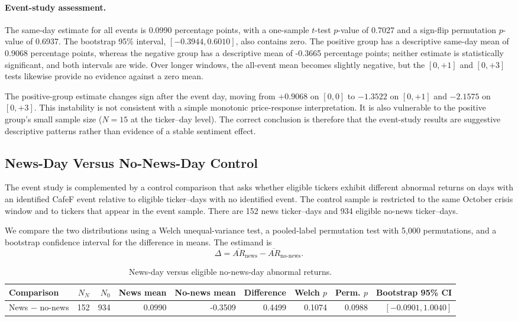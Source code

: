 \paragraph{Event-study assessment.}
The same-day estimate for all events is 0.0990 percentage points, with a one-sample $t$-test $p$-value of 0.7027 and a sign-flip permutation $p$-value of 0.6937. The bootstrap 95\% interval, $[-0.3944,0.6010]$, also contains zero. The positive group has a descriptive same-day mean of 0.9068 percentage points, whereas the negative group has a descriptive mean of -0.3665 percentage points; neither estimate is statistically significant, and both intervals are wide. Over longer windows, the all-event mean becomes slightly negative, but the $[0,+1]$ and $[0,+3]$ tests likewise provide no evidence against a zero mean.

The positive-group estimate changes sign after the event day, moving from $+0.9068$ on $[0,0]$ to $-1.3522$ on $[0,+1]$ and $-2.1575$ on $[0,+3]$. This instability is not consistent with a simple monotonic price-response interpretation. It is also vulnerable to the positive group's small sample size ($N=15$ at the ticker--day level). The correct conclusion is therefore that the event-study results are suggestive descriptive patterns rather than evidence of a stable sentiment effect.

\subsection{News-Day Versus No-News-Day Control}
\label{subsec:news-control}

The event study is complemented by a control comparison that asks whether eligible tickers exhibit different abnormal returns on days with an identified CafeF event relative to eligible ticker--days with no identified event. The control sample is restricted to the same October crisis window and to tickers that appear in the event sample. There are 152 news ticker--days and 934 eligible no-news ticker--days.

We compare the two distributions using a Welch unequal-variance test, a pooled-label permutation test with 5,000 permutations, and a bootstrap confidence interval for the difference in means. The estimand is
\[
 \Delta=\overline{AR}_{\text{news}}-\overline{AR}_{\text{no-news}}.
\]

\begin{table}[htbp]
\centering
\caption{News-day versus eligible no-news-day abnormal returns.}
\label{tab:news-control}
\begin{tabular}{lrrrrrrrr}
\toprule
\textbf{Comparison} & \textbf{$N_N$} & \textbf{$N_0$} & \textbf{News mean} & \textbf{No-news mean} & \textbf{Difference} & \textbf{Welch $p$} & \textbf{Perm. $p$} & \textbf{Bootstrap 95\% CI} \\
\midrule
News $-$ no-news & 152 & 934 & 0.0990 & -0.3509 & 0.4499 & 0.1074 & 0.0988 & $[-0.0901,1.0040]$ \\
\bottomrule
\end{tabular}
\end{table}

